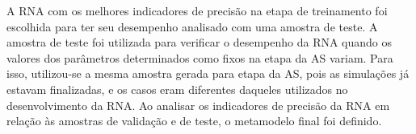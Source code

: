 \documentclass[brazil,hardcopy,openany,a5paper]{ufscthesis}
\begin{document}
		A RNA com os melhores indicadores de precisão na etapa de treinamento foi escolhida para ter seu desempenho analisado com uma amostra de teste. 
		A amostra de teste foi utilizada para verificar o desempenho da RNA quando os valores dos parâmetros determinados como fixos na etapa da AS variam. Para isso, utilizou-se a mesma amostra gerada para etapa da AS, pois as simulações já estavam finalizadas, e os casos eram diferentes daqueles utilizados no desenvolvimento da RNA.
		Ao analisar os indicadores de precisão da RNA em relação às amostras de validação e de teste, o metamodelo final foi definido.

%
%

	
\end{document}
